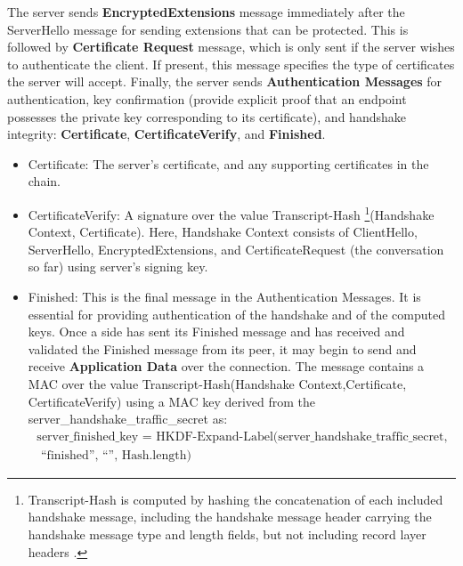 The server sends \textbf{EncryptedExtensions} message immediately after the ServerHello message for sending extensions that can be protected. This is followed by \textbf{Certificate Request} message, which is only sent if the server wishes to authenticate the client. If present, this message specifies the type of certificates the server will accept. Finally, the server sends \textbf{Authentication Messages} for authentication, key confirmation (provide explicit proof that an endpoint possesses the private key corresponding to its certificate), and handshake
integrity: \textbf{Certificate}, \textbf{CertificateVerify}, and \textbf{Finished}. 
\begin{itemize}
  \item Certificate: The server's certificate, and any supporting certificates in the chain.
  \item CertificateVerify: A signature over the value
 Transcript-Hash \footnote{Transcript-Hash is computed by hashing the concatenation of each included handshake message, including the handshake message header carrying the handshake message type and length fields, but not
 including record layer headers \cite{rfc8446}.}(Handshake Context, Certificate). Here, Handshake Context consists of ClientHello, ServerHello, EncryptedExtensions, and CertificateRequest (the conversation so far) using server's signing key. 
  \item Finished: This is the final message in the Authentication Messages. It is essential for providing authentication of the handshake and of the computed keys. Once a side has sent its Finished message and has received and validated the Finished message from its peer, it may begin to send and receive \textbf{Application Data} over the connection. The message contains a MAC over the value Transcript-Hash(Handshake Context,Certificate, CertificateVerify) using a MAC key derived from the server\_handshake\_traffic\_secret as:
  \begin{equation}
    \label{eq:finished}
    \begin{split}
      \text{server\_finished\_key =
      HKDF-Expand-Label(server\_handshake\_traffic\_secret,} \\ \text{ ``finished'', ``'', Hash.length)}
    \end{split}
  \end{equation}
\end{itemize}


